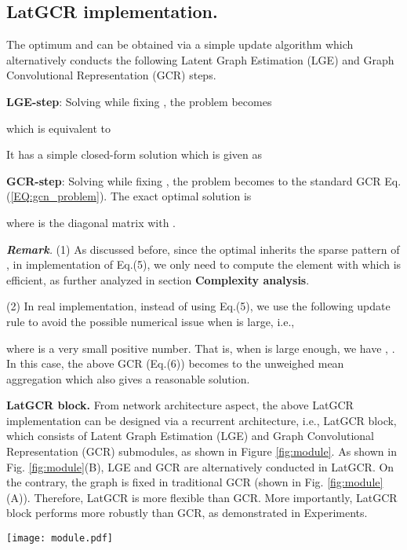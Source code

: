 \documentclass{article}
\begin{document}
\subsection{LatGCR implementation.}
The optimum  and  can be obtained via a simple update algorithm which {alternatively} conducts the following Latent Graph Estimation (LGE) and Graph Convolutional Representation (GCR) steps.

  \textbf{LGE-step}: Solving  while fixing , the problem becomes

which is equivalent to

It has a simple closed-form solution which is given as 



\textbf{GCR-step}: Solving  while fixing , the problem becomes
to the standard GCR Eq.(\ref{EQ:gcn_problem}). The exact optimal solution is

where  is the diagonal matrix with .

\emph{\textbf{Remark}.}
(1) As discussed before, since the optimal  inherits the sparse pattern of , 
 in implementation of Eq.(5), we only need to compute the element   with   which is efficient, as further analyzed in section \textbf{Complexity analysis}.

 (2) In real implementation, instead of using Eq.(5), we use the following update rule to avoid the possible numerical issue when  is large, i.e.,

where  is a very small positive number. That is, when  is large enough, we have , . In this case, the above GCR (Eq.(6)) becomes to the unweighed mean aggregation which also gives a reasonable solution.

\textbf{LatGCR block.} From network architecture aspect, the above LatGCR implementation can be designed
via a recurrent architecture, i.e., LatGCR block, which consists of  Latent Graph Estimation (LGE) and Graph Convolutional Representation (GCR) submodules, as shown in Figure \ref{fig:module}. 
As shown in Fig. \ref{fig:module}(B), LGE and GCR are alternatively conducted in LatGCR.
On the contrary, the graph  is fixed in traditional GCR (shown in Fig. \ref{fig:module}(A)). Therefore, LatGCR is more flexible than GCR.
More importantly, LatGCR block performs more robustly than GCR, as demonstrated in Experiments.

\begin{figure*}[ht]
\centering
\texttt{[image: module.pdf]}
  \caption{Architectures of  GCR and our LatGCR block.}\label{fig:module}
\end{figure*}
\end{document}
